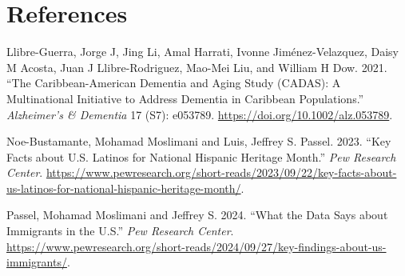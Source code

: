 \documentclass[
]{article}
\newlength{\cslhangindent}
\newenvironment{CSLReferences}[2] %
 {\begin{list}{}{%
  \setlength{\itemindent}{0pt}
  \setlength{\leftmargin}{0pt}
  \setlength{\parsep}{0pt}
  \ifodd #1
   \setlength{\leftmargin}{\cslhangindent}
   \setlength{\itemindent}{-1\cslhangindent}
  \fi
  \setlength{\itemsep}{#2\baselineskip}}}
 {\end{list}}
\begin{document}
\section*{References}\label{references}

\label{refs}
\begin{CSLReferences}{1}{0}
Llibre-Guerra, Jorge J, Jing Li, Amal Harrati, Ivonne Jiménez-Velazquez,
Daisy M Acosta, Juan J Llibre-Rodriguez, Mao-Mei Liu, and William H Dow.
2021. {``The {Caribbean}-{American} {Dementia} and {Aging} {Study}
({CADAS}): {A} Multinational Initiative to Address Dementia in
{Caribbean} Populations.''} \emph{Alzheimer's \& Dementia} 17 (S7):
e053789. \url{https://doi.org/10.1002/alz.053789}.

Noe-Bustamante, Mohamad Moslimani and Luis, Jeffrey S. Passel. 2023.
{``Key Facts about {U}.{S}. {Latinos} for {National} {Hispanic}
{Heritage} {Month}.''} \emph{Pew Research Center}.
\url{https://www.pewresearch.org/short-reads/2023/09/22/key-facts-about-us-latinos-for-national-hispanic-heritage-month/}.

Passel, Mohamad Moslimani and Jeffrey S. 2024. {``What the Data Says
about Immigrants in the {U}.{S}.''} \emph{Pew Research Center}.
\url{https://www.pewresearch.org/short-reads/2024/09/27/key-findings-about-us-immigrants/}.

\end{CSLReferences}
\end{document}
